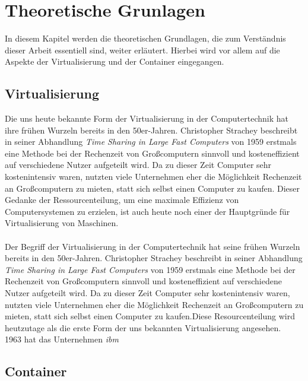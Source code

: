 \chapter{Theoretische Grunlagen}
In diesem Kapitel werden die theoretischen Grundlagen, die zum Verständnis dieser Arbeit essentiell sind, weiter erläutert. Hierbei wird vor allem auf die Aspekte der Virtualisierung und der Container eingegangen.
\section{Virtualisierung}
Die uns heute bekannte Form der Virtualisierung in der Computertechnik hat ihre frühen Wurzeln bereits in den 50er-Jahren. Christopher Strachey beschreibt in seiner Abhandlung \textit{Time Sharing in Large Fast Computers} von 1959 erstmals eine Methode bei der Rechenzeit von Großcomputern sinnvoll und kosteneffizient auf verschiedene Nutzer aufgeteilt wird.\autocite[Vgl.][]{McCarthy.1983} Da zu dieser Zeit Computer sehr kostenintensiv waren, nutzten viele Unternehmen eher die Möglichkeit Rechenzeit an Großcomputern zu mieten, statt sich selbst einen Computer zu kaufen. Dieser Gedanke der Ressourcenteilung, um eine maximale Effizienz von Computersystemen zu erzielen, ist auch heute noch einer der Hauptgründe für Virtualisierung von Maschinen.\\
\\
Der Begriff der Virtualisierung in der Computertechnik hat seine frühen Wurzeln bereits in den 50er-Jahren. Christopher Strachey beschreibt in seiner Abhandlung \textit{Time Sharing in Large Fast Computers} von 1959 erstmals eine Methode bei der Rechenzeit von Großcomputern sinnvoll und kosteneffizient auf verschiedene Nutzer aufgeteilt wird. Da zu dieser Zeit Computer sehr kostenintensiv waren, nutzten viele Unternehmen eher die Möglichkeit Rechenzeit an Großcomputern zu mieten, statt sich selbst einen Computer zu kaufen.\autocite[Vgl.][S. 18ff.]{Docker.2016}Diese Resourcenteilung wird heutzutage als die erste Form der uns bekannten Virtualisierung angesehen.\\
1963 hat das Unternehmen \textit{\ac{ibm}}
\section{Container}
